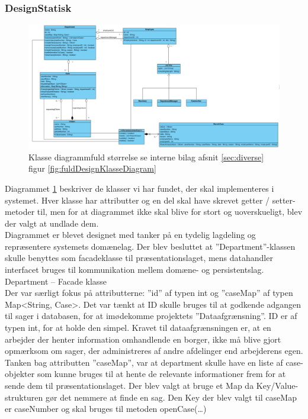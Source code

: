 \subsubsection{DesignStatisk}
\begin{figure}[h]
\includegraphics[width = \linewidth]{./PNG/design/designKlasseDiagram.PNG}
\caption{Klasse diagrammfuld størrelse se interne bilag afsnit \ref{sec:diverse} figur \ref{fig:fuldDesignKlasseDiagram}}
\label{fig:desginklasse}
\end{figure}
Diagrammet \ref{fig:desginklasse} beskriver de klasser vi har fundet, der skal implementeres i systemet. Hver klasse har attributter og en del skal have skrevet getter / setter-metoder til, men for at diagrammet ikke skal blive for stort og uoverskueligt, blev der valgt at undlade dem.\\
Diagrammet er blevet designet med tanker på en tydelig lagdeling og repræsentere systemets domænelag. Der blev besluttet at ”Department”-klassen skulle benyttes som facadeklasse til præsentationslaget, mens datahandler interfacet bruges til kommunikation mellem domæne- og persistentslag.
Department – Facade klasse\\
Der var særligt fokus på attributterne: ”id” af typen int og ”caseMap” af typen Map<String, Case>. Det var tænkt at ID skulle bruges til at godkende adgangen til sager i databasen, for at imødekomme projektets ”Dataafgrænsning”. ID er af typen int, for at holde den simpel. Kravet til dataafgrænsningen er, at en arbejder der henter information omhandlende en borger, ikke må blive gjort opmærksom om sager, der administreres af andre afdelinger end arbejderens egen.\\
Tanken bag attributten ”caseMap”, var at department skulle have en liste af case-objekter som kunne bruges til at hente de relevante informationer frem for at sende dem til præsentationslaget. Der blev valgt at bruge et Map da Key/Value-strukturen gør det nemmere at finde en sag. Den Key der blev valgt til caseMap er caseNumber og skal bruges til metoden openCase(…)\\
